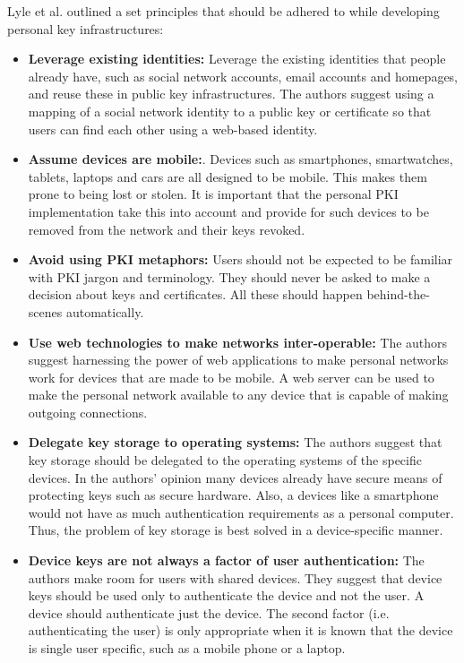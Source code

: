 Lyle et al.\cite{Lyle2013} outlined a set principles that should be adhered to while developing personal key infrastructures:
\begin{itemize}

	\item \textbf{Leverage existing identities:} Leverage the existing identities that people already have, such as social network accounts, email 				accounts and homepages, and reuse these in public key infrastructures. The authors suggest using a mapping of a social network identity to a 			public key or certificate so that users can find each other using a web-based identity.\\

	\item \textbf{Assume devices are mobile:}. Devices such as smartphones, smartwatches, tablets, laptops and cars are all designed to be 					mobile. This makes them prone to being lost or stolen. It is important that the personal PKI implementation take this into account and provide 			for such devices to be removed from the network and their keys revoked.\\
	
	\item \textbf{Avoid using PKI metaphors:} Users should not be expected to be familiar with PKI jargon and terminology. They should never be 			asked to make a decision about keys and certificates. All these should happen behind-the-scenes automatically.\\
	
	\item \textbf{Use web technologies to make networks inter-operable:} The authors suggest harnessing the power of web applications to make 			personal networks work for devices that are made to be mobile. A web server can be used to make the personal network available to any 					device that is capable of making outgoing connections.\\
	
	\item \textbf{Delegate key storage to operating systems:} The authors suggest that key storage should be delegated to the operating 						systems of the specific devices. In the authors' opinion many devices already have secure means of protecting keys such as secure hardware. 				Also, a devices like a smartphone would not have as much authentication requirements as a personal computer. Thus, the problem of key 					storage is best solved in a device-specific manner.\\
	
	\item \textbf{Device keys are not always a factor of user authentication:} The authors make room for users with shared devices. They suggest 			that device keys should be used only to authenticate the device and not the user. A device should authenticate just the device. The second 				factor (i.e. authenticating the user) is only appropriate when it is known that the device is single user specific, such as a mobile phone or a 					laptop.\\
\end{itemize}

